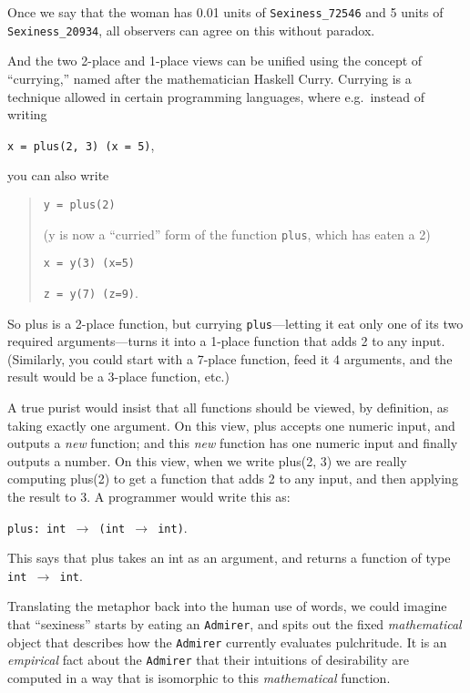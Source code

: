 {
 Once we say that the woman has 0.01 units of \texttt{Sexiness\_72546} and 5
units of \texttt{Sexiness\_20934}, all observers can agree on this without
paradox.}

{
 And the two 2-place and 1-place views can be unified using the
concept of ``currying,'' named after
the mathematician Haskell Curry. Currying is a technique allowed in
certain programming languages, where e.g.~instead of writing}

\begin{center}
\texttt{x = plus(2, 3) (x = 5)},
\end{center}


{
 you can also write}

\begin{quotation}
\texttt{y = plus(2)}

 (y is now a ``curried'' form of
the function \texttt{plus}, which has eaten a 2)

 \texttt{x = y(3) (x=5)}

 \texttt{z = y(7) (z=9)}.
\end{quotation}

{
 So plus is a 2-place function, but currying \texttt{plus}---letting it eat
only one of its two required arguments---turns it into a 1-place
function that adds 2 to any input. (Similarly, you could start with a
7-place function, feed it 4 arguments, and the result would be a
3-place function, etc.)}

{
 A true purist would insist that all functions should be viewed, by
definition, as taking exactly one argument. On this view, plus accepts
one numeric input, and outputs a \textit{new} function; and this
\textit{new} function has one numeric input and finally outputs a
number. On this view, when we write plus(2, 3) we are really computing
plus(2) to get a function that adds 2 to any input, and then applying
the result to 3. A programmer would write this as:}

\begin{center}
\texttt{plus: int $\rightarrow $ (int $\rightarrow $ int)}.
\end{center}

{
 This says that plus takes an int as an argument, and returns a
function of type \texttt{int $\rightarrow $ int}.}

{
 Translating the metaphor back into the human use of words, we
could imagine that ``sexiness''
starts by eating an \texttt{Admirer}, and spits out the fixed
\textit{mathematical} object that describes how the \texttt{Admirer} currently
evaluates pulchritude. It is an \textit{empirical} fact about the
\texttt{Admirer} that their intuitions of desirability are computed in a way
that is isomorphic to this \textit{mathematical} function.}

